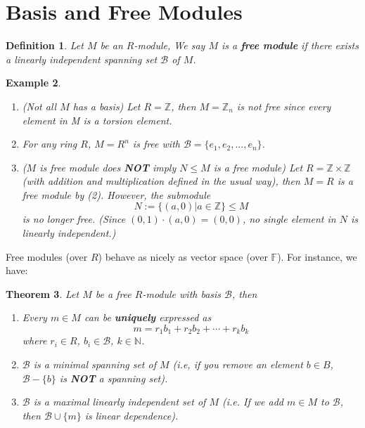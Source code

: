 \documentclass[12pt]{amsbook}
\newtheorem{theorem}{Theorem}[section]
\newtheorem{definition}[theorem]{Definition}
\newtheorem{example}[theorem]{Example}
\begin{document}
\section{Basis and Free Modules}

\begin{definition}
    Let $M$ be an $R$-module, We say $M$ is a {\bf free module} if there exists a linearly independent spanning set $\mathcal{B}$ of $M$.
\end{definition}

\begin{example}\
    \begin{enumerate}
        \item (Not all $M$ has a basis) Let $R=\mathbb{Z}$, then $M=\mathbb{Z}_n$ is not free since every element in M is a torsion element.
        \item For any ring $R$, $M = R^n$ is free with $\mathcal{B}=\{e_1,e_2,...,e_n\}$.
        \item ($M$ is free module does {\bf NOT} imply $N\leq M$ is a free module) Let $R=\mathbb{Z}\times \mathbb{Z}$ (with addition and multiplication defined in the usual way), then $M=R$ is a free module by (2). However, the submodule
        $$N:= \{(a,0)| a\in \mathbb{Z}\} \leq M$$
        is no longer free. (Since $(0,1)\cdot (a,0)= (0,0)$, no single element in $N$ is linearly independent.)
        
    \end{enumerate}
\end{example}

Free modules (over $R$) behave as nicely as vector space (over $\mathbb{F}$). For instance, we have:

\begin{theorem}
    Let $M$ be a free $R$-module with basis $\mathcal{B}$, then 
    \begin{enumerate}
        \item Every $m\in M$ can be {\bf uniquely} expressed as $$m=r_1b_1+r_2b_2+\cdots+ r_kb_k$$ where $r_i\in R$, $b_i\in \mathcal{B}$, $k\in \mathbb{N}$.
        \item $\mathcal{B}$ is a minimal spanning set of $M$ (i.e, if you remove an element $b\in B$, $\mathcal{B} - \{b\}$ is {\bf NOT} a spanning set).
        \item $\mathcal{B}$ is a maximal linearly independent set of $M$ (i.e. If we add $m\in M$ to $\mathcal{B}$, then $\mathcal{B}\cup \{m\}$ is linear dependence).
    \end{enumerate}
\end{theorem}
\end{document}
